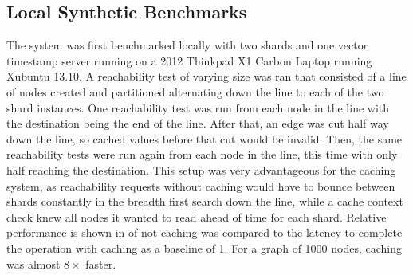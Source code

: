 \documentclass[letterpaper,twocolumn,11pt,tight]{article}
\begin{document}
\subsection{Local Synthetic Benchmarks}
The system was first benchmarked locally with two shards and one vector timestamp server running on a 2012 Thinkpad X1 Carbon Laptop running Xubuntu 13.10. A reachability test of varying size was ran that consisted of a line of nodes created and partitioned alternating down the line to each of the two shard instances.
One reachability test was run from each node in the line with the destination being the end of the line. After that, an edge was cut half way down the line, so cached values before that cut would be invalid. Then, the same reachability tests were run again from each node in the line, this time with only half reaching the destination. This setup was very advantageous for the caching system, as reachability requests without caching would have to bounce between shards constantly in the breadth first search down the line, while a cache context check knew all nodes it wanted to read ahead of time for each shard. Relative performance is shown in  of not caching was compared to the latency to complete the operation with caching as a baseline of 1. For a graph of 1000 nodes, caching was almost $8\times$ faster.

\end{document}
